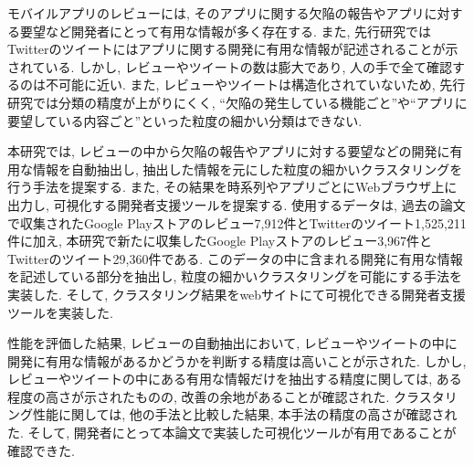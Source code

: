 
モバイルアプリのレビューには, そのアプリに関する欠陥の報告やアプリに対する要望など開発者にとって有用な情報が多く存在する. また, 先行研究ではTwitterのツイートにはアプリに関する開発に有用な情報が記述されることが示されている. しかし, レビューやツイートの数は膨大であり, 人の手で全て確認するのは不可能に近い. 
また, レビューやツイートは構造化されていないため, 先行研究では分類の精度が上がりにくく, ``欠陥の発生している機能ごと''や``アプリに要望している内容ごと''といった粒度の細かい分類はできない. 

本研究では, レビューの中から欠陥の報告やアプリに対する要望などの開発に有用な情報を自動抽出し, 抽出した情報を元にした粒度の細かいクラスタリングを行う手法を提案する. また, その結果を時系列やアプリごとにWebブラウザ上に出力し, 可視化する開発者支援ツールを提案する.
使用するデータは, 過去の論文で収集されたGoogle Playストアのレビュー7,912件とTwitterのツイート1,525,211件に加え, 本研究で新たに収集したGoogle Playストアのレビュー3,967件とTwitterのツイート29,360件である. このデータの中に含まれる開発に有用な情報を記述している部分を抽出し, 粒度の細かいクラスタリングを可能にする手法を実装した. 
そして, クラスタリング結果をwebサイトにて可視化できる開発者支援ツールを実装した. 

性能を評価した結果, レビューの自動抽出において, レビューやツイートの中に開発に有用な情報があるかどうかを判断する精度は高いことが示された. 
しかし, レビューやツイートの中にある有用な情報だけを抽出する精度に関しては, ある程度の高さが示されたものの, 改善の余地があることが確認された. 
クラスタリング性能に関しては, 他の手法と比較した結果, 本手法の精度の高さが確認された. 
そして, 開発者にとって本論文で実装した可視化ツールが有用であることが確認できた. 
